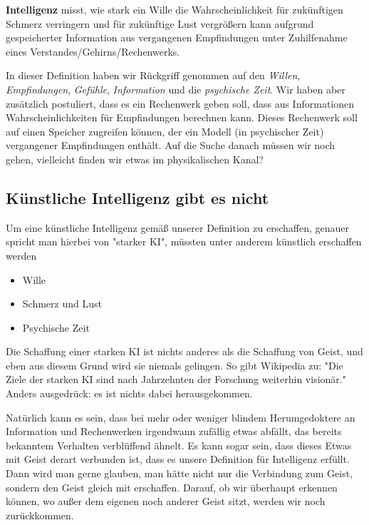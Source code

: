 \documentclass[12pt]{book}
\begin{document}
\textbf{Intelligenz} misst, wie stark ein Wille die Wahrscheinlichkeit für zukünftigen Schmerz verringern und für zukünftige Lust vergrößern kann aufgrund gespeicherter Information aus vergangenen Empfindungen unter Zuhilfenahme eines Verstandes/Gehirns/Rechenwerks.

In dieser Definition haben wir Rückgriff genommen auf den \emph{Willen}, \emph{Empfindungen}, \emph{Gefühle}, \emph{Information} und die \emph{psychische Zeit}. Wir haben aber zusätzlich postuliert, dass es ein Rechenwerk geben soll, dass aus Informationen Wahrscheinlichkeiten für Empfindungen berechnen kann. Dieses Rechenwerk soll auf einen Speicher zugreifen können, der ein Modell (in psychischer Zeit) vergangener Empfindungen enthält. Auf die Suche danach müssen wir noch gehen, vielleicht finden wir etwas im physikalischen Kanal?

\subsection{Künstliche Intelligenz gibt es nicht}

Um eine künstliche Intelligenz gemäß unserer Definition zu erschaffen, genauer spricht man hierbei von "starker KI", müssten unter anderem künstlich erschaffen werden

\begin{itemize}
\item Wille
\item Schmerz und Lust
\item Psychische Zeit
\end{itemize}

Die Schaffung einer starken KI ist nichts anderes als die Schaffung von Geist, und eben aus diesem Grund wird sie niemals gelingen. So gibt Wikipedia zu:
"Die Ziele der starken KI sind nach Jahrzehnten der Forschung weiterhin visionär." Anders ausgedrück: es ist nichts dabei herausgekommen.

Natürlich kann es sein, dass bei mehr oder weniger blindem Herumgedoktere an Information und Rechenwerken irgendwann zufällig etwas abfällt, das bereits bekanntem Verhalten verblüffend ähnelt. Es kann sogar sein, dass dieses Etwas mit Geist derart verbunden ist, dass es unsere Definition für Intelligenz erfüllt. Dann wird man gerne glauben, man hätte nicht nur die Verbindung zum Geist, sondern den Geist gleich mit erschaffen. Darauf, ob wir überhaupt erkennen können, wo außer dem eigenen noch anderer Geist sitzt, werden wir noch zurückkommen.
\end{document}
